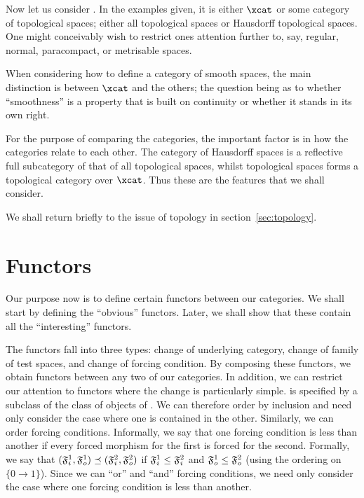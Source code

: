 \documentclass[%
12pt,%
arxiv,%
defaults
]{myclass}
\begin{document}
Now let us consider \ucat.
In the examples given, it is either \(\xcat\) or some category of topological spaces; either all topological spaces or Hausdorff topological spaces.
One might conceivably wish to restrict ones attention further to, say, regular, normal, paracompact, or metrisable spaces.

When considering how to define a category of smooth spaces, the main distinction is between \(\xcat\) and the others; the question being as to whether ``smoothness'' is a property that is built on continuity or whether it stands in its own right.

For the purpose of comparing the categories, the important factor is in how the categories relate to each other.
The category of Hausdorff spaces is a reflective full subcategory of that of all topological spaces, whilst topological spaces forms a topological category over \(\xcat\).
Thus these are the features that we shall consider.

We shall return briefly to the issue of topology in section~\ref{sec:topology}.

\section{Functors}
\label{sec:functor}


Our purpose now is to define certain functors between our categories.
We shall start by defining the ``obvious'' functors.
Later, we shall show that these contain all the ``interesting'' functors.

The functors fall into three types: change of underlying category, change of family of test spaces, and change of forcing condition.
By composing these functors, we obtain functors between any two of our categories.
In addition, we can restrict our attention to functors where the change is particularly simple.
\tcatu is specified by a subclass of the class of objects of \mcat.
We can therefore order \tcats by inclusion and need only consider the case where one is contained in the other.
Similarly, we can order forcing conditions.
Informally, we say that one forcing condition is less than another if every forced morphism for the first is forced for the second.
Formally, we say that \((\iforce^1, \oforce^1) \preceq (\iforce^2, \oforce^2)\) if \(\iforce^1 \le \iforce^2\) and \(\oforce^1 \le \oforce^2\) (using the ordering on \(\{0 \to 1\}\)).
Since we can ``or'' and ``and'' forcing conditions, we need only consider the case where one forcing condition is less than another.
\end{document}
